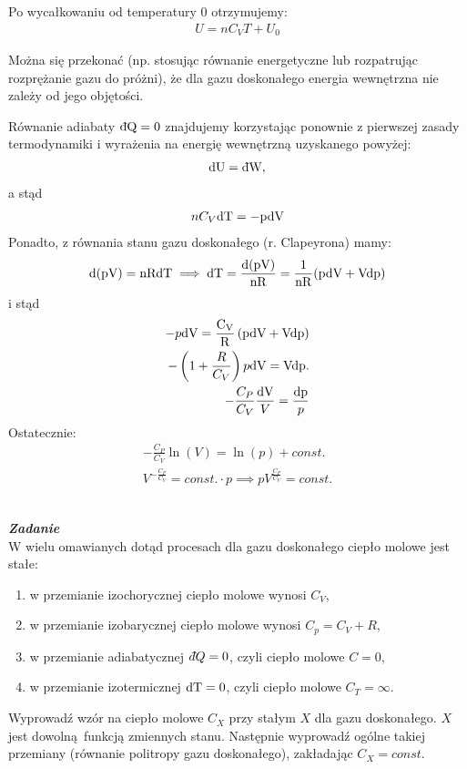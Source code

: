 \documentclass[11pt,a4paper]{article}
\newcounter{zadanie}\newcommand{\zadanie}[1][]{\addtocounter{zadanie}{1} ~\\  {\bf \emph{Zadanie \arabic{zadanie} #1 }} \\}
\newcommand{\dbar}{{\mkern3mu\mathchar'26\mkern-12mu d}}
\begin{document}
Po wycałkowaniu od temperatury 0 otrzymujemy:
\begin{align}
U = n C_V T + U_{0}
\end{align}

Można się przekonać (np. stosując równanie energetyczne lub rozpatrując
rozprężanie gazu do próżni), że dla gazu doskonałego energia wewnętrzna nie
zależy od jego objętości. 

Równanie adiabaty $\rm{\dbar} Q =0$ znajdujemy korzystając ponownie z pierwszej zasady termodynamiki 
i wyrażenia na energię wewnętrzną uzyskanego powyżej:
\begin{align}
\rm{d}U = \rm{\dbar} W,
\end{align} 
a stąd
\begin{align}
n C_V \rm{d} T = - p \rm{d}V
\end{align}
Ponadto, z równania stanu gazu doskonałego (r. Clapeyrona) mamy:
\begin{align}
\rm{d}(pV) = n R \rm{d} T \implies  \rm{d} T = \frac{\rm{d}(pV)}{n R} = \frac{1}{n R}(p\rm{d}V + V\rm{d}p  )
\end{align}
i stąd
\begin{align}
- p \rm{d}V  = \frac{C_V}{R}\left(  p \rm{d}V +  V \rm{d}p \right)\\
- \left( 1 + \frac{R}{C_V}\right) p \rm{d}V = V \rm{d}p. \\
-\frac{C_P}{C_V}\frac{\rm{d} V}{V}=\frac{\rm{d} p}{p}
\end{align}
Ostatecznie:
\begin{align*}
-\frac{C_P}{C_V}\ln(V) = \ln(p) + const. \\
V^{-\frac{C_P}{C_V}} = const. \cdot p \implies pV^{\frac{C_P}{C_V}} = const.
\end{align*}
\newpage
\zadanie
W wielu omawianych dotąd procesach dla gazu doskonałego ciepło molowe jest stałe:
\begin{enumerate}
\item w przemianie izochorycznej ciepło molowe wynosi $C_V$,
\item w przemianie izobarycznej ciepło molowe wynosi $C_p = C_V + R$,
\item w przemianie adiabatycznej $\dbar Q = 0$, czyli ciepło molowe $C = 0$,
\item w przemianie izotermicznej $\rm{d}T = 0$, czyli ciepło molowe $C_T = \infty$.
\end{enumerate}
Wyprowadź wzór na ciepło molowe $C_X$ przy stałym $X$ dla gazu doskonałego.
$X$ jest dowolną funkcją zmiennych stanu. Następnie wyprowadź ogólne takiej 
przemiany (równanie politropy gazu doskonałego), zakładając $C_X=const$.
\end{document}
